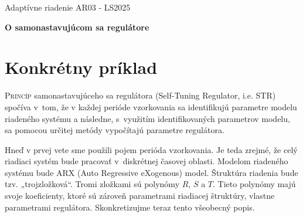 \documentclass[a4paper, 10pt, ]{article}
\def\oznacenieCasti{AR03 - LS2025}
\begin{document}
\lstset{%
style=mystyle,
rangebeginprefix=\#\#\#\ cellB\ ,%
rangebeginsuffix=\ \#\#\#,%
rangeendprefix=\#\#\#\ cellE\ ,%
rangeendsuffix=\ \#\#\#,%
includerangemarker=false,
}






\fontsize{12pt}{22pt}\selectfont

\centerline{\textsf{Adaptívne riadenie} \hfill \textsf{\oznacenieCasti}}

\fontsize{18pt}{22pt}\selectfont





\begin{flushleft}
	\textbf{\textsf{O samonastavujúcom sa regulátore}}
\end{flushleft}





\normalsize

\bigskip

{\hypersetup{hidelinks}

\tableofcontents

}

\bigskip

\vspace{18pt}












\section{Konkrétny príklad}
\label{konkretPriklad}


\lettrine[lines=3, nindent=0pt]{P}{rincíp} samonastavujúceho sa regulátora (Self-Tuning Regulator, i.e. STR) spočíva v~tom, že v každej perióde vzorkovania sa identifikujú parametre modelu riadeného systému a následne, s~využitím identifikovaných parametrov modelu, sa pomocou určitej metódy vypočítajú parametre regulátora.

Hneď v prvej vete sme použili pojem perióda vzorkovania. Je teda zrejmé, že celý riadiaci systém bude pracovať v~diskrétnej časovej oblasti. Modelom riadeného systému bude ARX (Auto Regressive eXogenous) model. Štruktúra riadenia bude tzv.  „trojzložková“. Tromi zložkami sú polynómy $R$, $S$ a $T$. Tieto polynómy majú svoje koeficienty, ktoré sú zároveň parametrami riadiacej štruktúry, vlastne parametrami regulátora.
Skonkretizujme teraz tento všeobecný popis.
\end{document}
